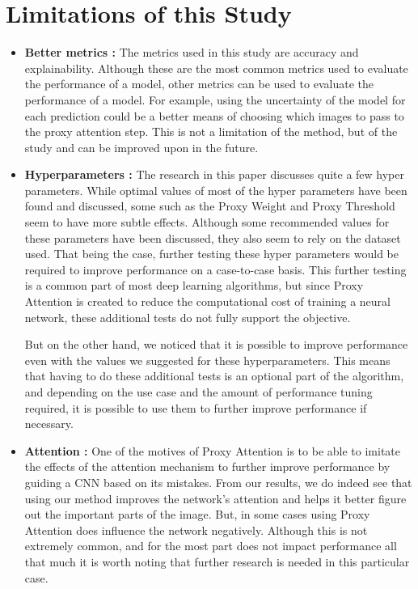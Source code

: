 \documentclass[a4paper,11pt,openright]{book}
\begin{document}
\section{Limitations of this Study}
\begin{itemize}
\item \textbf{Better metrics :} The metrics used in this study are accuracy and explainability. Although these are the most common metrics used to evaluate the performance of a model, other metrics can be used to evaluate the performance of a model. For example, using the uncertainty of the model for each prediction could be a better means of choosing which images to pass to the proxy attention step. This is not a limitation of the method, but of the study and can be improved upon in the future.
\item \textbf{Hyperparameters :} The research in this paper discusses quite a few hyper parameters. While optimal values of most of the hyper parameters have been found and discussed, some such as the Proxy Weight and Proxy Threshold seem to have more subtle effects. Although some recommended values for these parameters have been discussed, they also seem to rely on the dataset used. That being the case, further testing these hyper parameters would be required to improve performance on a case-to-case basis. This further testing is a common part of most deep learning algorithms, but since Proxy Attention is created to reduce the computational cost of training a neural network, these additional tests do not fully support the objective. 

But on the other hand, we noticed that it is possible to improve performance even with the values we suggested for these hyperparameters. This means that having to do these additional tests is an optional part of the algorithm, and depending on the use case and the amount of performance tuning required, it is possible to use them to further improve performance if necessary.
\item \textbf{Attention :} One of the motives of Proxy Attention is to be able to imitate the effects of the attention mechanism to further improve performance by guiding a CNN based on its mistakes. From our results, we do indeed see that using our method improves the network's attention and helps it better figure out the important parts of the image. But, in some cases using Proxy Attention does influence the network negatively. Although this is not extremely common, and for the most part does not impact performance all that much it is worth noting that further research is needed in this particular case. 


\end{itemize}
\end{document}
